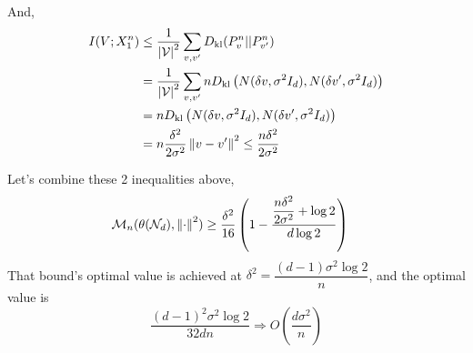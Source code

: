 \documentclass[10pt,xcolor={usenames,dvipsnames,table},aspectratio=169]{beamer}
\begin{document}
\begin{frame}
    And,
\begin{align*}
    I(V; X_1^{n}) 
    &\leq \dfrac{1}{\left\lvert\mathcal{V}\right\rvert^2} \sum_{v, v'}  D_{\rm kl}(P_v^{n} || P_{v'}^{n})   \\
    &= \dfrac{1}{\left\lvert\mathcal{V}\right\rvert^2} \sum_{v, v'} n D_{\rm kl}\left( N(\delta v, \sigma^2 I_d), N(\delta v', \sigma^2 I_d) \right) \\
    &= n D_{\rm kl}\left( N(\delta v, \sigma^2 I_d), N(\delta v', \sigma^2 I_d) \right) \\
    &= n \dfrac{\delta^2}{2\sigma^2 } \left\lVert v - v'\right\rVert^2 
    \leq \dfrac{n \delta^2}{2 \sigma^2}
\end{align*}
    
Let's combine these 2 inequalities above,
\begin{align*}
    \mathcal{M}_n(\theta(\mathcal{N}_d), \left\lVert\cdot\right\rVert^2) 
    &\geq \dfrac{\delta^2}{16} \left( 1 - \dfrac{\dfrac{n \delta^2}{2 \sigma^2} + \log 2}{d \log 2} \right)
\end{align*} 
That bound's optimal value is achieved at $\delta^2 = \dfrac{(d-1)\sigma^2 \log 2}{n}$, and the optimal value is
\[
\dfrac{(d-1)^2 \sigma^2 \log 2}{32 dn} \Rightarrow O\left(  \dfrac{d\sigma^2}{n} \right)
\] 
\end{frame}
\end{document}
